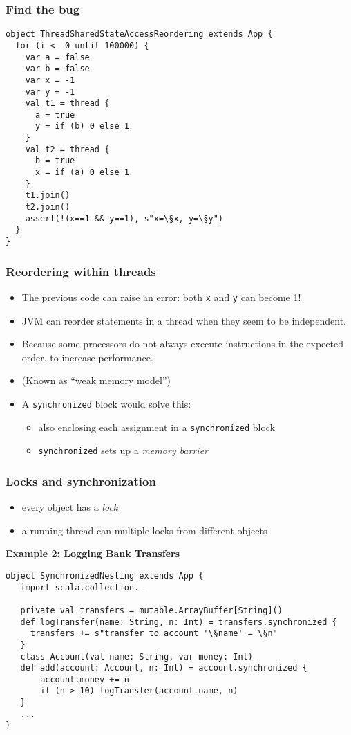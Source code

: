 \documentclass[aspectratio=169]{beamer}
\begin{document}
\begin{frame}[fragile]\frametitle{Find the bug}
\begin{lstlisting}[emph={assert,sleep,log,thread,join}]
object ThreadSharedStateAccessReordering extends App {
  for (i <- 0 until 100000) {
    var a = false
    var b = false
    var x = -1
    var y = -1
    val t1 = thread {
      a = true
      y = if (b) 0 else 1
    }
    val t2 = thread {
      b = true
      x = if (a) 0 else 1
    }
    t1.join()
    t2.join()
    assert(!(x==1 && y==1), s"x=\§x, y=\§y")
  }
}
\end{lstlisting}
\end{frame}


\begin{frame}\frametitle{Reordering within threads}
\begin{itemize}
  \item The previous code can raise an error: both \texttt{x} and \texttt{y} can become 1!

  \item JVM can reorder statements in a thread when they seem to be independent.

  \item Because some processors do not always execute instructions in the expected order, to increase performance.
  \item (Known as ``weak memory model'')
  \item A \texttt{synchronized} block would solve this:
    \begin{itemize}
      \item also enclosing each assignment in a \texttt{synchronized} block
      \item \texttt{synchronized} sets up a \emph{memory barrier} 
    \end{itemize}
\end{itemize}
\end{frame}




\begin{frame}[fragile]\frametitle{Locks and synchronization}
\begin{itemize}
  \item every object has a \emph{lock}
  \item a running \alert{thread} can  multiple locks from different objects
\end{itemize}

\textbf{Example 2: Logging Bank Transfers}
\begin{lstlisting}[emph={assert,sleep,log,thread,join,synchronized}]
object SynchronizedNesting extends App {
   import scala.collection._
   
   private val transfers = mutable.ArrayBuffer[String]()
   def logTransfer(name: String, n: Int) = transfers.synchronized {
     transfers += s"transfer to account '\§name' = \§n"
   }
   class Account(val name: String, var money: Int)
   def add(account: Account, n: Int) = account.synchronized {
       account.money += n
       if (n > 10) logTransfer(account.name, n)
   }
   ...
}
\end{lstlisting}
\end{frame}
\end{document}

